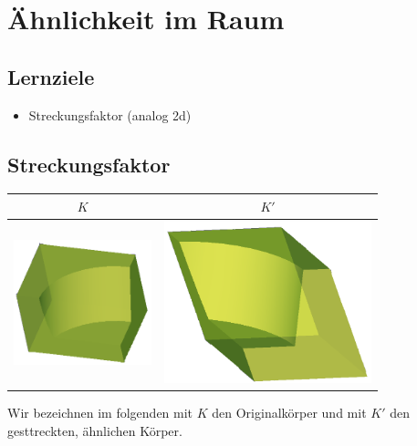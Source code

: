 \section{Ähnlichkeit im Raum}


\subsection*{Lernziele}
\begin{itemize}
\item Streckungsfaktor (analog 2d)
\end{itemize}
\newpage

\subsection{Streckungsfaktor}

\begin{tabular}{cc}
  $K$ & $K'$ \\
  \hline
  \includegraphics[width=4cm]{tals/stereo/img/aehnlich_klein.png} & \includegraphics[width=6cm]{tals/stereo/img/aehnlich_gross.png}\\

  \end{tabular} 

Wir bezeichnen im folgenden mit $K$ den Originalkörper und mit $K'$ den gesttreckten, ähnlichen Körper.

